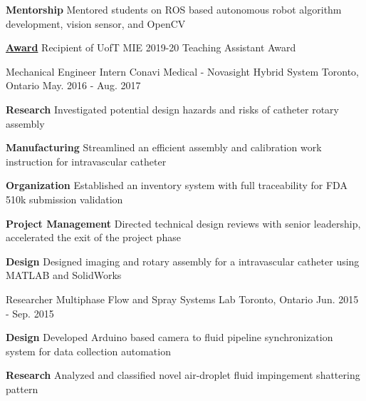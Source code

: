 \begin{cventries}
{\begin{cvitems}
{			}
			\item {
				\textbf{Mentorship} Mentored students on ROS based autonomous robot algorithm development, vision sensor, and OpenCV
			}
			\item \textbf{\href{https://www.mie.utoronto.ca/congratulations-2019-20-teaching-assistant-award-winners-lap-tak-chu-richard-hu-behzad-khamidehi-ben-leung-and-khalil-sidawi/}{Award}} Recipient of UofT MIE 2019-20 Teaching Assistant Award
		\end{cvitems}
	}
	\cventry
	{Mechanical Engineer Intern}
	{Conavi Medical - Novasight Hybrid System} 
	{Toronto, Ontario}
	{May. 2016 - Aug. 2017}
	{
		\begin{cvitems}
			\item {
				\textbf{Research} Investigated potential design hazards and risks of catheter rotary assembly
			}
			\item {
				\textbf{Manufacturing} Streamlined an efficient assembly and calibration work instruction for intravascular catheter}
			\item {
				\textbf{Organization} Established an inventory system with full traceability for FDA 510k submission validation}
			\item {
				\textbf{Project Management} Directed technical design reviews with senior leadership, accelerated the exit of the project phase}
			\item {
				\textbf{Design} Designed imaging and rotary assembly for a intravascular catheter using MATLAB and SolidWorks
			}
		\end{cvitems}
	}

	\cventry
	{Researcher}
	{Multiphase Flow and Spray Systems Lab} 
	{Toronto, Ontario}
	{Jun. 2015 - Sep. 2015}
	{
		\begin{cvitems}
			\item {
				\textbf{Design} Developed Arduino based camera to fluid pipeline synchronization system for data collection automation
			}
			\item {
				\textbf{Research} Analyzed and classified novel air-droplet fluid impingement shattering pattern}
		\end{cvitems}
	}  
\end{cventries}
